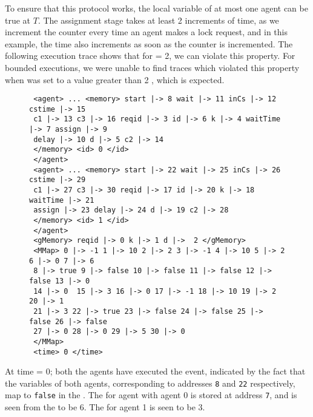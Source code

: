  To ensure that this protocol works, the local  variable of at most one agent can be true at  $T$. The assignment stage takes at least 2 increments of time, as we increment the counter every time an agent makes a lock request, and in this example, the time also increments as soon as the counter is incremented. The following execution trace shows that for  = 2, we can violate this property. For bounded executions, we were unable to find traces which violated this property when  was set to a value greater than 2 , which is expected. 
 \begin{figure}[H]
\begin{verbatim}
 <agent> ... <memory> start |-> 8 wait |-> 11 inCs |-> 12 cstime |-> 15 
 c1 |-> 13 c3 |-> 16 reqid |-> 3 id |-> 6 k |-> 4 waitTime |-> 7 assign |-> 9
 delay |-> 10 d |-> 5 c2 |-> 14 
 </memory> <id> 0 </id> 
 </agent> 
 <agent> ... <memory> start |-> 22 wait |-> 25 inCs |-> 26 cstime |-> 29
 c1 |-> 27 c3 |-> 30 reqid |-> 17 id |-> 20 k |-> 18 waitTime |-> 21 
 assign |-> 23 delay |-> 24 d |-> 19 c2 |-> 28 
 </memory> <id> 1 </id> 
 </agent>
 <gMemory> reqid |-> 0 k |-> 1 d |->  2 </gMemory>
 <MMap> 0 |-> -1 1 |-> 10 2 |-> 2 3 |-> -1 4 |-> 10 5 |-> 2 6 |-> 0 7 |-> 6
 8 |-> true 9 |-> false 10 |-> false 11 |-> false 12 |-> false 13 |-> 0
 14 |-> 0  15 |-> 3 16 |-> 0 17 |-> -1 18 |-> 10 19 |-> 2 20 |-> 1 
 21 |-> 3 22 |-> true 23 |-> false 24 |-> false 25 |-> false 26 |-> false
 27 |-> 0 28 |-> 0 29 |-> 5 30 |-> 0 
 </MMap>
 <time> 0 </time>
\end{verbatim}
\end{figure}
At time = 0; both the agents have executed the  event, indicated by the fact that the  variables of both agents, corresponding to addresses \verb|8| and \verb|22| respectively, map to \verb|false| in the . The  for agent with agent 0 is stored at address \verb|7|, and is seen from the  to be 6. The  for agent 1 is seen to be 3.   

